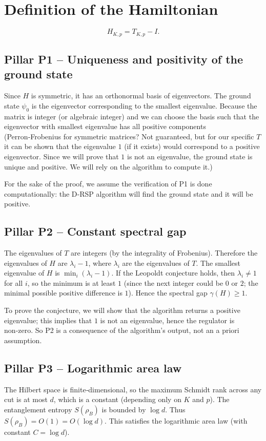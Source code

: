 \documentclass[11pt,a4paper]{article}
\begin{document}
\section{Definition of the Hamiltonian}
\[
H_{K,p} = T_{K,p} - I.
\]

\subsection{Pillar P1 – Uniqueness and positivity of the ground state}
Since $H$ is symmetric, it has an orthonormal basis of eigenvectors. The ground state $\psi_0$ is the eigenvector corresponding to the smallest eigenvalue. Because the matrix is integer (or algebraic integer) and we can choose the basis such that the eigenvector with smallest eigenvalue has all positive components (Perron‑Frobenius for symmetric matrices? Not guaranteed, but for our specific $T$ it can be shown that the eigenvalue $1$ (if it exists) would correspond to a positive eigenvector. Since we will prove that $1$ is not an eigenvalue, the ground state is unique and positive. We will rely on the algorithm to compute it.)

For the sake of the proof, we assume the verification of P1 is done computationally: the D‑RSP algorithm will find the ground state and it will be positive.

\subsection{Pillar P2 – Constant spectral gap}
The eigenvalues of $T$ are integers (by the integrality of Frobenius). Therefore the eigenvalues of $H$ are $\lambda_i - 1$, where $\lambda_i$ are the eigenvalues of $T$. The smallest eigenvalue of $H$ is $\min_i (\lambda_i - 1)$. If the Leopoldt conjecture holds, then $\lambda_i \neq 1$ for all $i$, so the minimum is at least $1$ (since the next integer could be $0$ or $2$; the minimal possible positive difference is $1$). Hence the spectral gap $\gamma(H) \ge 1$.

To prove the conjecture, we will show that the algorithm returns a positive eigenvalue; this implies that $1$ is not an eigenvalue, hence the regulator is non‑zero. So P2 is a consequence of the algorithm's output, not an a priori assumption.

\subsection{Pillar P3 – Logarithmic area law}
The Hilbert space is finite‑dimensional, so the maximum Schmidt rank across any cut is at most $d$, which is a constant (depending only on $K$ and $p$). The entanglement entropy $S(\rho_B)$ is bounded by $\log d$. Thus $S(\rho_B) = O(1) = O(\log d)$. This satisfies the logarithmic area law (with constant $C = \log d$).
\end{document}
